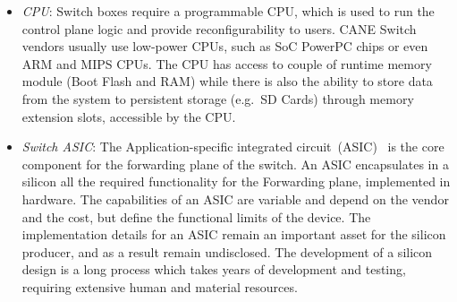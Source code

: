 \begin{itemize}
  \item \emph{CPU}: Switch boxes require a programmable CPU, which is used to
        run the control plane logic and provide reconfigurability to users.
CANE        Switch vendors usually use low-power CPUs, such as SoC PowerPC chips or
        even ARM and MIPS CPUs. The CPU has access to couple of runtime memory
        module (Boot Flash and RAM) while there is also the ability to store
        data from the system to persistent storage (e.g.~SD Cards) through
        memory extension slots, accessible by the CPU.
  \item \emph{Switch ASIC}: The Application-specific integrated
        circuit~(ASIC)~\cite{hp-asic,broadcom-asic,intel-asic} is the core
        component for the forwarding plane of the switch.  An ASIC encapsulates
        in a silicon all the required functionality for the Forwarding plane,
        implemented in hardware. The capabilities of an ASIC are variable and
        depend on the vendor and the cost, but define the functional limits of
        the device. The implementation details for an ASIC remain an important
        asset for the silicon producer, and as a result remain undisclosed. The
        development of a silicon design is a long process which takes years of
        development and testing, requiring extensive human and material
        resources. 


\end{itemize}
